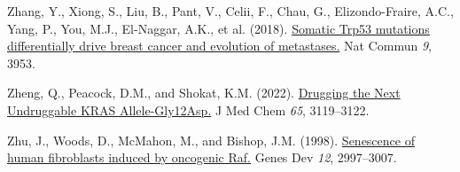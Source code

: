 \begin{CSLReferences}{0}{0}
\leavevmode{}%
Zhang, Y., Xiong, S., Liu, B., Pant, V., Celii, F., Chau, G., Elizondo-Fraire, A.C., Yang, P., You, M.J., El-Naggar, A.K., et al. (2018). \href{https://doi.org/10.1038/s41467-018-06146-9}{Somatic Trp53 mutations differentially drive breast cancer and evolution of metastases.} Nat Commun \emph{9}, 3953.

\leavevmode{}%
Zheng, Q., Peacock, D.M., and Shokat, K.M. (2022). \href{https://doi.org/10.1021/acs.jmedchem.2c00099}{Drugging the Next Undruggable KRAS Allele-Gly12Asp.} J Med Chem \emph{65}, 3119--3122.

\leavevmode{}%
Zhu, J., Woods, D., McMahon, M., and Bishop, J.M. (1998). \href{https://doi.org/10.1101/gad.12.19.2997}{Senescence of human fibroblasts induced by oncogenic Raf.} Genes Dev \emph{12}, 2997--3007.

\end{CSLReferences}
